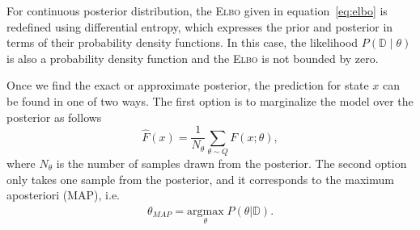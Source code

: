 \begin{rem}
  For continuous posterior distribution, the \textsc{Elbo} given in
  equation~\eqref{eq:elbo} is redefined using differential entropy, which
  expresses the prior and posterior in terms of their probability density
  functions. In this case, the likelihood $P(\mathbb{D} \mid \theta)$ is also
  a probability density function and the \textsc{Elbo} is not bounded by zero.
\end{rem}


Once we find the exact or approximate posterior, the prediction for state $x$
can be found in one of two ways. The first option is to marginalize the model
over the posterior as follows~\cite{jospin2020hands}
\begin{equation}
  \hat{F}(x) = \frac{1}{N_{\theta}} \sum_{\theta \sim Q} F(x; \theta),
  \label{eqn:marginalization}
\end{equation} 
where $N_{\theta}$ is the number of samples drawn from the posterior. 
%
%
%
The second option only takes one sample from the posterior, and it corresponds
to the maximum aposteriori (MAP), i.e. 
\begin{align} 
  \theta_{MAP}=\underset{\theta}{\textrm{argmax}}\; P(\theta | \mathbb{D}).
\end{align}


